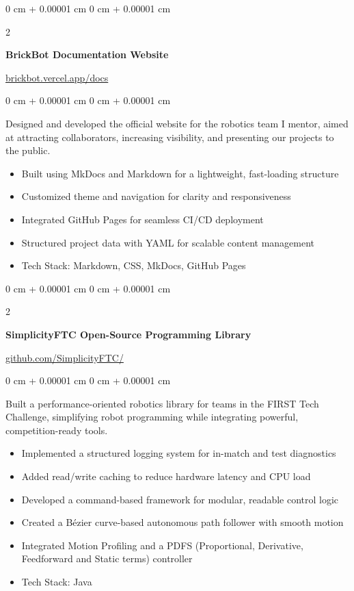 \documentclass[10pt, letterpaper]{article}
\newenvironment{highlights}{
    \begin{itemize}[
        topsep=0.10 cm,
        parsep=0.10 cm,
        partopsep=0pt,
        itemsep=0pt,
        leftmargin=0 cm + 10pt
    ]
}{
    \end{itemize}
} %
\newenvironment{onecolentry}{
    \begin{adjustwidth}{
        0 cm + 0.00001 cm
    }{
        0 cm + 0.00001 cm
    }
}{
    \end{adjustwidth}
} %
\newenvironment{twocolentry}[2][]{
    \onecolentry
    \def\secondColumn{#2}
    \setcolumnwidth{\fill, 4.5 cm}
    \begin{paracol}{2}
}{
    \switchcolumn \raggedleft \secondColumn
    \end{paracol}
    \endonecolentry
} %
\begin{document}
\vspace{0.2 cm}

 \begin{twocolentry}{
    \href{https://brickbot.vercel.app/docs}{brickbot.vercel.app/docs}
}
    \textbf{BrickBot Documentation Website}
\end{twocolentry}

\vspace{0.10 cm}
\begin{onecolentry}
    Designed and developed the official website for the robotics team I mentor, aimed at attracting collaborators, increasing visibility, and presenting our projects to the public.
    \begin{highlights}
        \item Built using MkDocs and Markdown for a lightweight, fast-loading structure
        \item Customized theme and navigation for clarity and responsiveness
        \item Integrated GitHub Pages for seamless CI/CD deployment
        \item Structured project data with YAML for scalable content management
        \item Tech Stack: Markdown, CSS, MkDocs, GitHub Pages
    \end{highlights}
\end{onecolentry}

\vspace{0.2 cm}

\begin{twocolentry}{
    \href{https://github.com/SimplicityFTC/SimplicityFTC-Quickstart}{github.com/SimplicityFTC/}
}
    \textbf{SimplicityFTC Open-Source Programming Library}
\end{twocolentry}

\vspace{0.10 cm}
\begin{onecolentry}
    Built a performance-oriented robotics library for teams in the FIRST Tech Challenge, simplifying robot programming while integrating powerful, competition-ready tools.
    \begin{highlights}
        \item Implemented a structured logging system for in-match and test diagnostics
        \item Added read/write caching to reduce hardware latency and CPU load
        \item Developed a command-based framework for modular, readable control logic
        \item Created a Bézier curve-based autonomous path follower with smooth motion
        \item Integrated Motion Profiling and a PDFS (Proportional, Derivative, Feedforward and Static terms) controller
        \item Tech Stack: Java
    \end{highlights}
\end{onecolentry}
\end{document}
